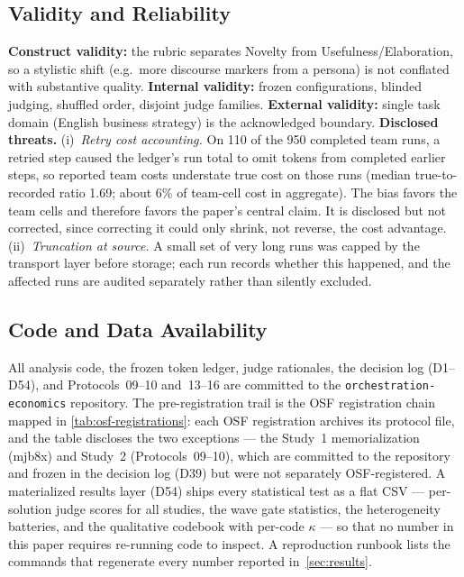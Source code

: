 \documentclass[12pt,a4paper]{article}
\begin{document}
\subsection{Validity and Reliability}

\textbf{Construct validity:} the rubric separates Novelty from
Usefulness/Elaboration, so a stylistic shift (e.g.\ more discourse markers from
a persona) is not conflated with substantive quality. \textbf{Internal validity:}
frozen configurations, blinded judging, shuffled order, disjoint judge families.
\textbf{External validity:} single task domain (English business strategy) is
the acknowledged boundary. \textbf{Disclosed threats.} (i)~\emph{Retry cost accounting.} On 110 of the 950
completed team runs, a retried step caused the ledger's run total to omit
tokens from completed earlier steps, so reported team costs understate true
cost on those runs (median true-to-recorded ratio 1.69; about 6\% of team-cell
cost in aggregate). The bias favors the team cells and therefore favors the
paper's central claim. It is disclosed but not corrected, since correcting it
could only shrink, not reverse, the cost advantage. (ii)~\emph{Truncation at source.} A small set of
very long runs was capped by the transport layer before storage; each run
records whether this happened, and the affected runs are audited separately
rather than silently excluded.

\subsection{Code and Data Availability}
All analysis code, the frozen token ledger, judge rationales, the decision log
(D1--D54), and Protocols~09--10 and~13--16 are committed to the
\texttt{orchestration-economics} repository. The pre-registration trail is the
OSF registration chain mapped in \cref{tab:osf-registrations}: each OSF
registration archives its protocol file, and the table discloses the two
exceptions --- the Study~1 memorialization (mjb8x) and Study~2
(Protocols~09--10), which are committed to the repository and frozen in the
decision log (D39) but were not separately OSF-registered.
A materialized results layer (D54) ships every statistical test as a flat CSV
--- per-solution judge scores for all studies, the wave gate statistics, the
heterogeneity batteries, and the qualitative codebook with per-code $\kappa$
--- so that no number in this paper requires re-running code to inspect.
A reproduction runbook
\citep{SandveEtAl2013} lists the commands that regenerate every number reported
in~\cref{sec:results}.
\end{document}
